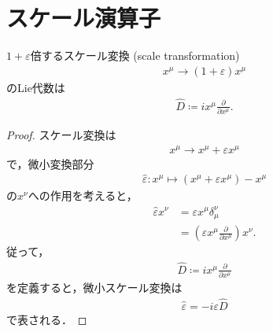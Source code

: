 \section{スケール演算子}
\begin{prop}[スケール変換]
	\(1+\varepsilon\)倍するスケール変換 (scale transformation)
	\begin{align}
		x^{\mu}\longrightarrow{}(1+\varepsilon)x^{\mu}
	\end{align}
	のLie代数は
	\begin{align}
		\hat{D}\coloneqq{}ix^{\mu}\frac{\partial}{\partial{}x^{\mu}}.
	\end{align}
\end{prop}
\begin{proof}
	スケール変換は
	\begin{align}
		x^{\mu}\longrightarrow{}x^{\mu}+\varepsilon{}x^{\mu}
	\end{align}
	で，微小変換部分
	\begin{align}
		\hat{\varepsilon}:x^{\mu}\mapsto{}(x^{\mu}+\varepsilon{}x^{\mu})-x^{\mu}
	\end{align}
	の\(x^{\nu}\)への作用を考えると，
	\begin{align}
		\hat{\varepsilon}x^{\nu} & =\varepsilon{}x^{\mu}\delta^{\nu}_{\mu}                                      \\
		                         & =\left(\varepsilon{}x^{\mu}\frac{\partial}{\partial{}x^{\mu}}\right)x^{\nu}.
	\end{align}
	従って，
	\begin{align}
		\hat{D}\coloneqq{}ix^{\mu}\frac{\partial}{\partial{}x^{\mu}}
	\end{align}
	を定義すると，微小スケール変換は
	\begin{align}
		\hat{\varepsilon}=-i\varepsilon{}\hat{D}
	\end{align}
	で表される．
\end{proof}
